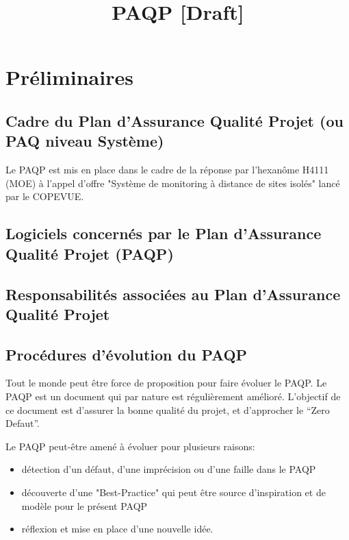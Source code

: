 \documentclass[a4paper]{article}
\begin{document}
\title{PAQP [Draft]}
\maketitle


\section{Préliminaires}

\subsection{Cadre du Plan d'Assurance Qualité Projet (ou PAQ niveau Système)}

Le PAQP est mis en place dans le cadre de la réponse par l'hexanôme H4111 (MOE) à l'appel d'offre "Système de monitoring à distance de sites isolés" lancé par le COPEVUE.

\subsection{Logiciels concernés par le Plan d'Assurance Qualité Projet (PAQP)}

\subsection{Responsabilités associées au Plan d'Assurance Qualité Projet}
\subsection{Procédures d'évolution du PAQP}

Tout le monde peut être force de proposition pour faire évoluer le PAQP. Le PAQP est un document qui par nature est régulièrement amélioré. L'objectif de ce document est d'assurer la bonne qualité du projet, et d'approcher le ``Zero Defaut''.

Le PAQP peut-être amené à évoluer pour plusieurs raisons:

\begin{itemize}
\item détection d'un défaut, d'une imprécision ou d'une faille dans le PAQP
\item découverte d'une "Best-Practice" qui peut être source d'inspiration et de modèle pour le présent PAQP
\item réflexion et mise en place d'une nouvelle idée.
\end{itemize}
\end{document}
